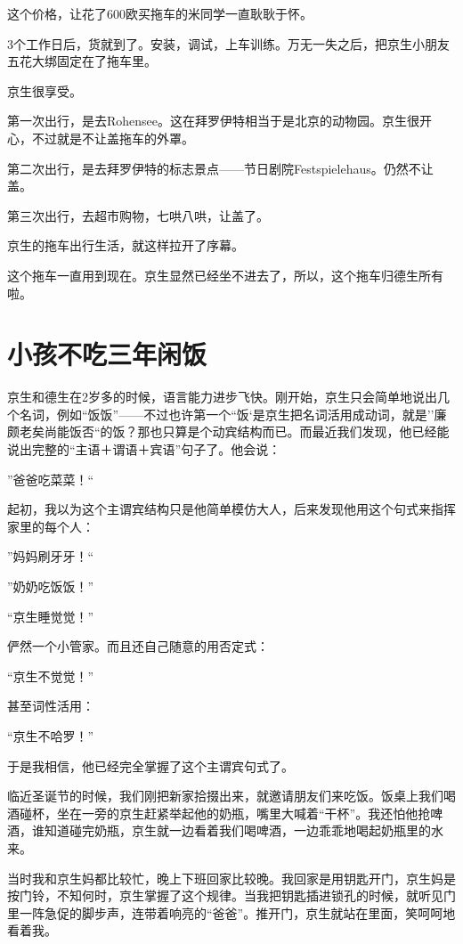 \documentclass[twoside,openright,headings=optiontohead]{ctexbook} %
\begin{document}
{这个价格，让花了600欧买拖车的米同学一直耿耿于怀。

3个工作日后，货就到了。安装，调试，上车训练。万无一失之后，把京生小朋友五花大绑固定在了拖车里。

京生很享受。

第一次出行，是去Rohensee。这在拜罗伊特相当于是北京的动物园。京生很开心，不过就是不让盖拖车的外罩。

第二次出行，是去拜罗伊特的标志景点------节日剧院Festspielehaus。仍然不让盖。

第三次出行，去超市购物，七哄八哄，让盖了。

京生的拖车出行生活，就这样拉开了序幕。

这个拖车一直用到现在。京生显然已经坐不进去了，所以，这个拖车归德生所有啦。

\chapter*{小孩不吃三年闲饭}\label{three-years-old}

京生和德生在2岁多的时候，语言能力进步飞快。刚开始，京生只会简单地说出几个名词，例如``饭饭''------不过也许第一个``饭`是京生把名词活用成动词，就是''廉颇老矣尚能饭否``的饭？那也只算是个动宾结构而已。而最近我们发现，他已经能说出完整的``主语＋谓语＋宾语''句子了。他会说：

''爸爸吃菜菜！``

起初，我以为这个主谓宾结构只是他简单模仿大人，后来发现他用这个句式来指挥家里的每个人：

''妈妈刷牙牙！``

''奶奶吃饭饭！''

``京生睡觉觉！''

俨然一个小管家。而且还自己随意的用否定式：

``京生不觉觉！''

甚至词性活用：

``京生不哈罗！''

于是我相信，他已经完全掌握了这个主谓宾句式了。

临近圣诞节的时候，我们刚把新家拾掇出来，就邀请朋友们来吃饭。饭桌上我们喝酒碰杯，坐在一旁的京生赶紧举起他的奶瓶，嘴里大喊着``干杯''。我还怕他抢啤酒，谁知道碰完奶瓶，京生就一边看着我们喝啤酒，一边乖乖地喝起奶瓶里的水来。

当时我和京生妈都比较忙，晚上下班回家比较晚。我回家是用钥匙开门，京生妈是按门铃，不知何时，京生掌握了这个规律。当我把钥匙插进锁孔的时候，就听见门里一阵急促的脚步声，连带着响亮的``爸爸''。推开门，京生就站在里面，笑呵呵地看着我。

}
\end{document}
